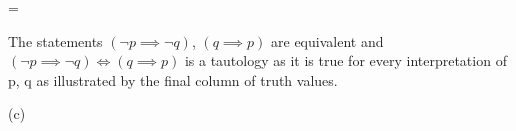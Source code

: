 \documentclass[a4paper,10pt,fleqn]{article}
\begin{document}
\setlength{\leftskip}{\dimexpr\parindent+2em\relax}
\savedleftskip=\leftskip
\noindent
{}
\bigskip


\bigskip

\setlength{\leftskip}{\dimexpr\parindent+2em\relax}
\noindent The statements $(\lnot p \implies \lnot q)$, $(q \implies p)$ are equivalent and $(\lnot p \implies \lnot q) \iff (q \implies p)$ is a tautology as it is true for every interpretation of p, q as illustrated by the final column of truth values.

\bigskip

\setlength{\leftskip}{0pt}
\medskip

\noindent\hspace*{\parindent}(c)
\end{document}
